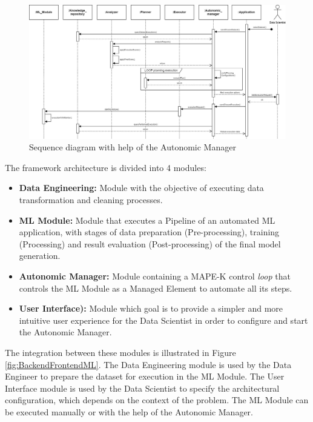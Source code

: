 \documentclass[sigconf]{acmart}
\begin{document}
\begin{figure}
\clearpage
\includegraphics[scale=0.395]{images/Diagrama_Sequencia-eng.jpg}
\caption {Sequence diagram with help of the Autonomic Manager}
\label{fig:DiagramaSequencia}
\end{figure}

The framework architecture is divided into 4 modules:

\begin{itemize}
    \item {\textbf{Data Engineering:}} Module with the objective of executing data transformation and cleaning processes.
	\item {\textbf{ML Module:}} Module that executes a Pipeline of an automated ML application, with stages of data preparation (Pre-pro\-cess\-ing), training (Processing) and result evaluation (Post-processing) of the final model generation.
     \item {\textbf{Autonomic Manager:}} Module containing a MAPE-K control \textit{loop} that controls the ML Module as a Managed Element to automate all its steps.
     \item {\textbf{User Interface):}} Module which goal is to provide a simpler and more intuitive user experience for the Data Scientist in order to configure and start the Autonomic Manager.
\end{itemize}

The integration between these modules is illustrated in Figure \ref{fig:BackendFrontendML}. The Data Engineering module is used by the Data Engineer to prepare the dataset for execution in the ML Module. The User Interface module is used by the Data Scientist to specify the architectural configuration, which depends on the context of the problem. The ML Module can be executed manually or with the help of the Autonomic Manager.
\end{document}
